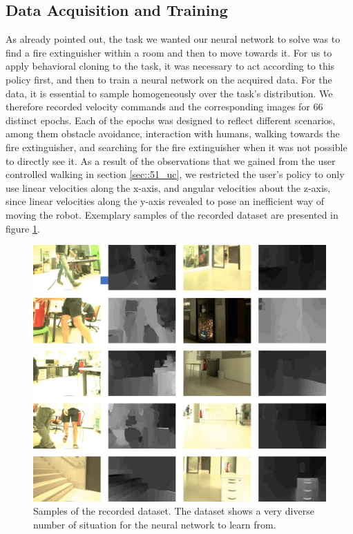 \subsection{Data Acquisition and Training}
\label{sec::523_da}
As already pointed out, the task we wanted our neural network to solve was to find a fire extinguisher within a room and then to move towards it. For us to apply behavioral cloning to the task, it was necessary to act according to this policy first, and then to train a neural network on the acquired data. For the data, it is essential to sample homogeneously over the task's distribution. We therefore recorded velocity commands and the corresponding images for 66 distinct epochs. Each of the epochs was designed to reflect different scenarios, among them obstacle avoidance, interaction with humans, walking towards the fire extinguisher, and searching for the fire extinguisher when it was not possible to directly see it. As a result of the observations that we gained from the user controlled walking in section \ref{sec::51_uc}, we restricted the user's policy to only use linear velocities along the x-axis, and angular velocities about the z-axis, since linear velocities along the y-axis revealed to pose an inefficient way of moving the robot. Exemplary samples of the recorded dataset are presented in figure \ref{fig::523_dataset}.
\begin{figure}[h]
	\centering
	\includegraphics[scale=.4]{chapters/05_experiments/02_autonomous_walking/dataset_diversity.png}
	\caption{Samples of the recorded dataset. The dataset shows a very diverse number of situation for the neural network to learn from.}
	\label{fig::523_dataset}
\end{figure}
